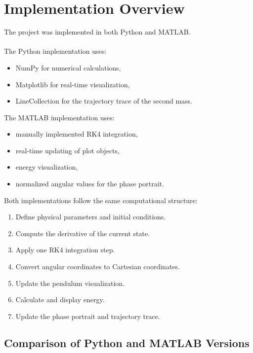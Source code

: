\documentclass[12pt,a4paper]{article}
\begin{document}
\section{Implementation Overview}

The project was implemented in both Python and MATLAB.
\\\\
The Python implementation uses:
\begin{itemize}
    \item NumPy for numerical calculations,
    \item Matplotlib for real-time visualization,
    \item LineCollection for the trajectory trace of the second mass.
\end{itemize}
The MATLAB implementation uses:
\begin{itemize}
    \item manually implemented RK4 integration,
    \item real-time updating of plot objects,
    \item energy visualization,
    \item normalized angular values for the phase portrait.
\end{itemize}
Both implementations follow the same computational structure:
\begin{enumerate}
    \item Define physical parameters and initial conditions.
    \item Compute the derivative of the current state.
    \item Apply one RK4 integration step.
    \item Convert angular coordinates to Cartesian coordinates.
    \item Update the pendulum visualization.
    \item Calculate and display energy.
    \item Update the phase portrait and trajectory trace.
\end{enumerate}

\subsection{Comparison of Python and MATLAB Versions}
\end{document}
